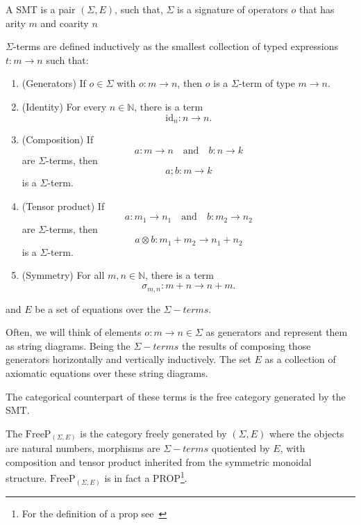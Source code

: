 \begin{definition}
	A SMT is a pair $(\Sigma,E)$, such that,  $\Sigma$ is a signature of operators $o$ that has arity $m$ and coarity $n$

	\medskip

	$\Sigma$-terms are defined inductively as the smallest collection of
	typed expressions $t : m \to n$ such that:

	\begin{enumerate}

		\item (Generators) If $o \in \Sigma$ with $o : m \to n$, then $o$ is a $\Sigma$-term of type $m \to n$.
		\item (Identity)
		      For every $n \in \mathbb{N}$, there is a term
		      \[
			      \mathrm{id}_n : n \to n.
		      \]

		\item (Composition)
		      If
		      \[
			      a : m \to n
			      \quad \text{and} \quad
			      b : n \to k
		      \]
		      are $\Sigma$-terms, then
		      \[
			      a ; b : m \to k
		      \]
		      is a $\Sigma$-term.

		\item (Tensor product)
		      If
		      \[
			      a : m_1 \to n_1
			      \quad \text{and} \quad
			      b : m_2 \to n_2
		      \]
		      are $\Sigma$-terms, then
		      \[
			      a \otimes b : m_1 + m_2 \to n_1 + n_2
		      \]
		      is a $\Sigma$-term.

		\item (Symmetry)   For all $m,n \in \mathbb{N}$, there is a term
		      \[
			      \sigma_{m,n} : m+n \to n+m.
		      \]
	\end{enumerate}

	\medskip

	and $E$ be a set of equations over the $\Sigma-terms$.
\end{definition}

Often, we will think of elements $o:m\to n \in \Sigma$ as generators and represent them as string diagrams. Being the $\Sigma-terms$ the results of composing those generators horizontally and vertically inductively. The set $E$ as a collection of axiomatic equations over these string diagrams.

The categorical counterpart of these terms is the free category generated by the SMT.

\begin{definition}
	The $\text{FreeP}_{(\Sigma,E)}$ is the category freely generated by $(\Sigma,E)$ where the objects are natural numbers, morphisms are $\Sigma-terms$ quotiented by $E$, with composition and tensor product inherited from the symmetric monoidal structure. $\text{FreeP}_{(\Sigma,E)}$ is in fact a PROP\footnote{ For the definition of a prop see~\cite{maclane1998categories}}.
\end{definition}

